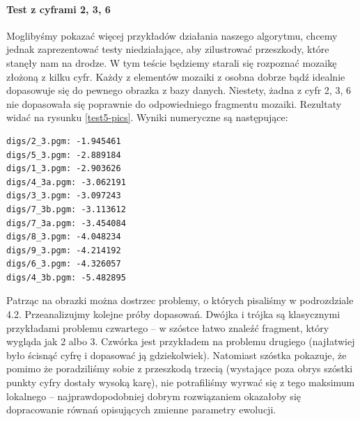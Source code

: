 \documentclass[a4paper,12pt,leqno]{article}
\begin{document}
\paragraph{Test z cyframi 2, 3, 6}

Moglibyśmy pokazać więcej przykładów działania naszego algorytmu, chcemy jednak zaprezentować testy niedziałające, aby zilustrować przeszkody, które stanęły nam na drodze.
W tym teście będziemy starali się rozpoznać mozaikę złożoną z kilku cyfr. Każdy z elementów mozaiki z osobna dobrze bądź idealnie dopasowuje się do pewnego obrazka z bazy danych.
Niestety, żadna z cyfr 2, 3, 6 nie dopasowała się poprawnie do odpowiedniego fragmentu mozaiki. Rezultaty widać na rysunku \ref{test5-pics}. Wyniki numeryczne są następujące:

\begin{verbatim}
digs/2_3.pgm: -1.945461
digs/5_3.pgm: -2.889184
digs/1_3.pgm: -2.903626
digs/4_3a.pgm: -3.062191
digs/3_3.pgm: -3.097243
digs/7_3b.pgm: -3.113612
digs/7_3a.pgm: -3.454084
digs/8_3.pgm: -4.048234
digs/9_3.pgm: -4.214192
digs/6_3.pgm: -4.326057
digs/4_3b.pgm: -5.482895
\end{verbatim}

Patrząc na obrazki można dostrzec problemy, o których pisaliśmy w podrozdziale 4.2. Przeanalizujmy kolejne próby dopasowań. Dwójka i trójka są klasycznymi przykładami problemu
czwartego -- w szóstce łatwo znaleźć fragment, który wygląda jak 2 albo 3. Czwórka jest przykładem na problemu drugiego (najłatwiej było ścisnąć cyfrę i dopasować ją gdziekolwiek).
Natomiast szóstka pokazuje, że pomimo że poradziliśmy sobie z przeszkodą trzecią (wystające poza obrys szóstki punkty cyfry dostały wysoką karę), nie potrafiliśmy wyrwać się z
tego maksimum lokalnego -- najprawdopodobniej dobrym rozwiązaniem okazałoby się dopracowanie równań opisujących zmienne parametry ewolucji.
\end{document}
